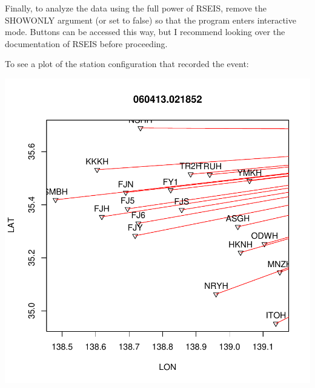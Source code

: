 \documentclass{article}
\begin{document}
Finally, to analyze the data using the full power of RSEIS, remove the 
SHOWONLY argument (or set to false) so that the program enters
interactive mode.  Buttons can be accessed this way, but I recommend
looking over the documentation of RSEIS before proceeding.

To see a plot of the station configuration that recorded
the event:
\begin{Schunk}
\end{Schunk}
\includegraphics{WIN2R-012}
\end{document}
